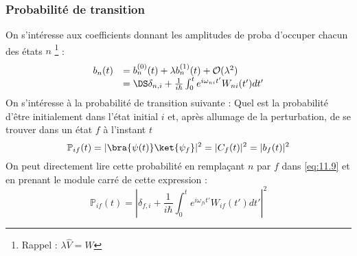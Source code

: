 		\subsubsection{Probabilité de transition}
		On s'intéresse aux coefficients donnant les amplitudes de proba d'occuper chacun des états $n$
		\footnote{Rappel : $\lambda \hat{V} =\hat{W}$} :
		\begin{equation}
		\begin{array}{ll}
		b_n(t) &= b_n^{(0)}(t) + \lambda b_n^{(1)}(t) + \mathcal{O}(\lambda^2)		\\
		&=\DS \delta_{n,i} + \frac{1}{i\hbar}\int_0^t e^{i\omega_{ni}t'}W_{ni}(t')dt'
		\end{array}
		\label{eq:11.9}
		\end{equation}
		On s'intéresse à la probabilité de transition suivante : Quel est la probabilité d'être 
		initialement dans l'état initial $i$ et, après allumage de la perturbation, de se 
		trouver dans un état $f$ à l'instant $t$ 
		\begin{equation}
		\mathbb{P}_{if}(t) = |\bra{\psi(t)}\ket{\psi_f}|^2 = |C_f(t)|^2 = |b_f(t)|^2
		\end{equation}
		On peut directement lire cette probabilité en remplaçant $n$ par $f$ dans \eqref{eq:11.9} 
		et en prenant le module carré de cette expression : 
		\begin{equation}
		\mathbb{P}_{if}(t) = \left| \delta_{f,i} + \frac{1}{i\hbar}\int_0^t e^{i\omega_{fi}t'}
		W_{if}(t')dt' \right|^2
		\end{equation}
		
